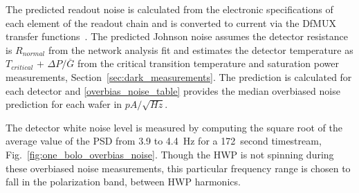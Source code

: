 The predicted readout noise is calculated from the electronic specifications of each element of the readout chain and is converted to current via the \ac{DfMUX} transfer functions~\citep{aubin_thesis}. 
The predicted Johnson noise assumes the detector resistance is $R_{normal}$ from the network analysis fit and estimates the detector temperature as $T_{critical}$ + $\Delta P / \overline{G}$ from the critical transition temperature and saturation power measurements, Section~\ref{sec:dark_measurements}. 
The prediction is calculated for each detector and \TAB\ref{overbias_noise_table} provides the median overbiased noise prediction for each wafer in $pA/\sqrt{Hz}$. %

The detector white noise level is measured 
by computing the square root of the average value of the \ac{PSD} from 3.9 to 4.4~Hz for a 172~second 
timestream, Fig.~\ref{fig:one_bolo_overbias_noise}. 
Though the \ac{HWP} is not spinning during these overbiased noise measurements, this particular frequency range is chosen to fall in the polarization band, between \ac{HWP} harmonics. 

